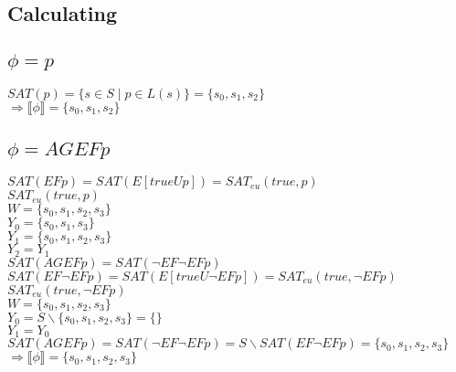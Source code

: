 \documentclass[a4paper,10pt]{article}
\begin{document}
\subsection*{Calculating}

\subsection*{$\phi = p$}
\hspace*{5mm} $SAT(p)=\{ s \in S \mid p\in L(s)\} = \{s_0,s_1,s_2\}$ 
\\[0.25cm] 
\hspace*{5mm} $\Rightarrow \llbracket \phi \rrbracket = \{s_0,s_1,s_2\}$
\subsection*{$\phi = AGEFp$}
\hspace*{5mm} $SAT(EFp)=SAT(E[trueUp])=SAT_{eu}(true,p)$ 
\\[0.25cm] 
\hspace*{5mm}$SAT_{eu}(true,p)$ 
\\[0.25cm] 
\hspace*{10mm} $W = \{s_0,s_1,s_2,s_3\}$ 
\\[0.25cm] 
\hspace*{10mm} $Y_0 = \{s_0,s_1,s_3\}$ 
\\[0.25cm] 
\hspace*{10mm} $Y_1 = \{s_0,s_1,s_2,s_3\}$ 
\\[0.25cm] 
\hspace*{10mm} $Y_2 = Y_1$ 
\\[0.25cm] 
\hspace*{5mm} $SAT(AGEFp)=SAT(\neg EF \neg EF p)$ 
\\[0.25cm] 
\hspace*{5mm} $SAT(EF \neg EF p) =  SAT(E[trueU\neg EF p]) = SAT_{eu}(true,\neg EF p)$ 
\\[0.25cm] 
\hspace*{5mm} $SAT_{eu}(true,\neg EF p)$ 
\\[0.25cm] 
\hspace*{10mm} $W = \{s_0,s_1,s_2,s_3\}$ 
\\[0.25cm] 
\hspace*{10mm} $Y_0 = S \backslash \{s_0,s_1,s_2,s_3\} = \{ \}$ 
\\[0.25cm] 
\hspace*{10mm} $Y_1 = Y_0$ 
\\[0.25cm] 
\hspace*{4.9mm} $SAT(AGEFp)=SAT(\neg EF \neg EF p) = S\backslash SAT(EF \neg EF p) = \{s_0,s_1,s_2,s_3 \}$ 
\\[0.25cm] 
\hspace*{5mm} $\Rightarrow \llbracket \phi \rrbracket = \{s_0,s_1,s_2,s_3\}$
\end{document}
